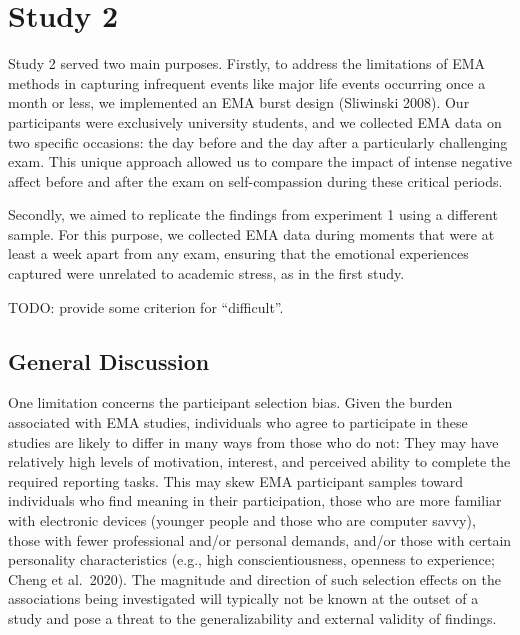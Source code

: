 \documentclass[
  man,floatsintext]{apa6}
\begin{document}
\hypertarget{study-2}{%
\section{Study 2}\label{study-2}}

Study 2 served two main purposes. Firstly, to address the limitations of EMA methods in capturing infrequent events like major life events occurring once a month or less, we implemented an EMA burst design (Sliwinski 2008). Our participants were exclusively university students, and we collected EMA data on two specific occasions: the day before and the day after a particularly challenging exam. This unique approach allowed us to compare the impact of intense negative affect before and after the exam on self-compassion during these critical periods.

Secondly, we aimed to replicate the findings from experiment 1 using a different sample. For this purpose, we collected EMA data during moments that were at least a week apart from any exam, ensuring that the emotional experiences captured were unrelated to academic stress, as in the first study.

TODO: provide some criterion for ``difficult''.

\newpage

\hypertarget{general-discussion}{%
\subsection{General Discussion}\label{general-discussion}}

One limitation concerns the participant selection bias. Given the burden associated with EMA studies, individuals who agree to participate in these studies are likely to differ in many ways from those who do not: They may have relatively high levels of motivation, interest, and perceived ability to complete the required reporting tasks. This may skew EMA participant samples toward individuals who find meaning in their participation, those who are more familiar with electronic devices (younger people and those who are computer savvy), those with fewer professional and/or personal demands, and/or those with certain personality characteristics (e.g., high conscientiousness, openness to experience; Cheng et al.~2020). The magnitude and direction of such selection effects on the associations being investigated will typically not be known at the outset of a study and pose a threat to the generalizability and external validity of findings.
\end{document}
